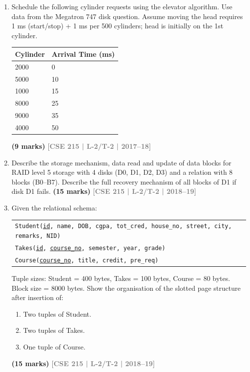 \documentclass[12pt,a3paper]{article}
\newcommand{\yr}[1]{\hfill\textcolor{gray}{\small\textbf{[#1]}}}
\newcommand{\mk}[1]{\textcolor{orange!70!black}{\small\textbf{(#1 marks)}}}
\begin{document}
\begin{enumerate}
\item Schedule the following cylinder requests using the elevator algorithm. Use data from the Megatron 747 disk question. Assume moving the head requires 1 ms (start/stop) + 1 ms per 500 cylinders; head is initially on the 1st cylinder.

\medskip
\begin{center}
\begin{tabular}{ll}
\toprule
\textbf{Cylinder} & \textbf{Arrival Time (ms)}\\
\midrule
2000 & 0\\
5000 & 10\\
1000 & 15\\
8000 & 25\\
9000 & 35\\
4000 & 50\\
\bottomrule
\end{tabular}
\end{center}
  \mk{9} \yr{CSE 215 | L-2/T-2 | 2017--18}

\item Describe the storage mechanism, data read and update of data blocks for RAID level 5 storage with 4 disks (D0, D1, D2, D3) and a relation with 8 blocks (B0--B7). Describe the full recovery mechanism of all blocks of D1 if disk D1 fails.
\mk{15} \yr{CSE 215 | L-2/T-2 | 2018--19}

\item Given the relational schema:
\begin{center}
\begin{tabular}{l}
\texttt{Student(\underline{id}, name, DOB, cgpa, tot\_cred, house\_no, street, city, remarks, NID)}\\
\texttt{Takes(\underline{id}, \underline{course\_no}, semester, year, grade)}\\
\texttt{Course(\underline{course\_no}, title, credit, pre\_req)}
\end{tabular}
\end{center}
Tuple sizes: Student = 400 bytes, Takes = 100 bytes, Course = 80 bytes. Block size = 8000 bytes. Show the organisation of the slotted page structure after insertion of:
\begin{enumerate}
  \item Two tuples of Student.
  \item Two tuples of Takes.
  \item One tuple of Course.
\end{enumerate}
 \mk{15} \yr{CSE 215 | L-2/T-2 | 2018--19}


\end{enumerate}
\end{document}
